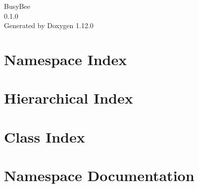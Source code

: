 \documentclass[twoside]{book}
\newcommand{\+}{\discretionary{\mbox{\scriptsize$\hookleftarrow$}}{}{}}
\newcommand{\clearemptydoublepage}{%
    \newpage{\pagestyle{empty}\cleardoublepage}%
  }
\begin{document}
  \raggedbottom
    \hypersetup{pageanchor=false,
                bookmarksnumbered=true,
                pdfencoding=unicode
               }
  \begin{titlepage}
  \vspace*{7cm}
  \begin{center}%
  {\Large Busy\+Bee}\\
  [1ex]\large 0.\+1.\+0 \\
  \vspace*{1cm}
  {\large Generated by Doxygen 1.12.0}\\
  \end{center}
  \end{titlepage}
  \clearemptydoublepage
  \tableofcontents
  \clearemptydoublepage
  \hypersetup{pageanchor=true}
\chapter{Namespace Index}

\chapter{Hierarchical Index}

\chapter{Class Index}

\chapter{Namespace Documentation}












\end{document}
